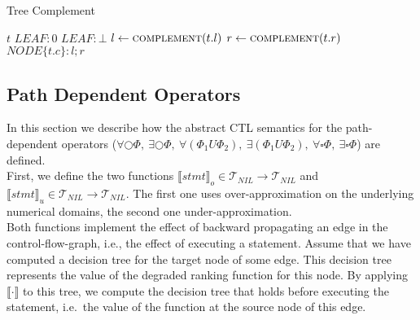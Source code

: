 \documentclass[11pt,a4paper,titlepage]{article}
\theoremstyle{definition}
\begin{document}
\begin{algorithm}[t]                    
    \caption{Tree Complement}         
    \label{alg:tree_complement}       
    \begin{algorithmic}
            \State \Return $t$
            \State \Return $LEAF: 0$
            \State \Return $LEAF: \bot$
        \Else
            \State $l \gets \Call{complement}{t.l}$
            \State $r \gets \Call{complement}{t.r}$
            \State \Return $NODE\{t.c \}: l ; r$
        \EndIf
        \EndFunction
\end{algorithmic}
\end{algorithm}


\subsection{Path Dependent Operators}

In this section we describe how the abstract CTL semantics for the path-dependent operators 
($\forall\bigcirc\Phi,\ \exists\bigcirc\Phi,\ \forall(\Phi_1 U \Phi_2),\ \exists(\Phi_1 U \Phi_2),\ \forall\square\Phi,\ \exists\square\Phi$)
are defined.\\

First, we define the two functions ${\llbracket stmt \rrbracket}_o \in \mathcal{T}_{NIL} \rightarrow \mathcal{T}_{NIL}$
and ${\llbracket stmt \rrbracket}_u \in \mathcal{T}_{NIL} \rightarrow \mathcal{T}_{NIL}$. 
The first one uses over-approximation on the underlying numerical domains, the second one under-approximation.\\

Both functions implement the effect of backward propagating an edge 
in the control-flow-graph, i.e., the effect of executing a statement. 
Assume that we have computed a decision tree for the target node of some edge. 
This decision tree represents the value of the degraded ranking function for this node. 
By applying ${\llbracket \cdot \rrbracket}$ to this tree, we compute the decision tree 
that holds before executing the statement, i.e.\, the value of the function at the source node of this edge.
\end{document}
